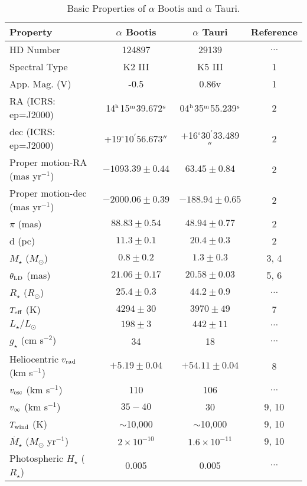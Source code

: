 \begin{table}[!hb]\small
\begin{center}
\caption[Basic Properties of $\alpha$ Bootis and $\alpha$ Tauri.]
{Basic Properties of $\alpha$ Bootis and $\alpha$ Tauri.}
\begin{tabular}{lccc}
\hline
\hline
\rule{0pt}{2.5ex}Property & $\alpha$ Bootis & $\alpha$ Tauri & Reference\\
\hline
\rule{0pt}{2.5ex}HD Number & 124897 & 29139 & $\ldots$\\
Spectral Type & K2 III & K5 III& 1\\ 
App. Mag. (V) & -0.5 & 0.86v & 1\\
RA (ICRS: ep=J2000)&14$^{\rm{h}}$15$^{\rm{m}}$39.672$^{\rm{s}}$&04$^{\rm{h}}$35$^{\rm{m}}$55.239$^{\rm{s}}$&2\\
dec (ICRS: ep=J2000) & +19$^{\circ}$10$^{\prime}$56.673$^{\prime\prime}$ & +16$^{\circ}$30$^{\prime}$33.489$^{\prime\prime}$ & 2 \\
Proper motion-RA (mas yr$^{-1}$)& $-1093.39 \pm 0.44$ & $63.45\pm 0.84$  & 2 \\
Proper motion-dec (mas yr$^{-1}$)& $-2000.06 \pm 0.39$ & $-188.94\pm 0.65$ & 2 \\
$\pi$ (mas)& $88.83\pm 0.54$ & $48.94\pm 0.77$& 2\\
d (pc)& $11.3 \pm 0.1$ & $20.4 \pm 0.3$& 2\\
$M_{\star}$ ($M_{\odot}$) & $0.8 \pm 0.2$ & $1.3 \pm 0.3$& 3, 4 \\
$\theta _{\rm{LD}}$ (mas)& $21.06\pm 0.17$ & $20.58 \pm 0.03$& 5, 6 \\
$R_{\star}$ ($R_{\odot}$)& $25.4 \pm 0.3$ & $44.2 \pm 0.9$ & $\ldots$ \\
$T_{\rm{eff}}$ (K) & $4294 \pm 30$ & $3970 \pm 49$& 7 \\
$L_{\star}/L_{\odot}$&$198 \pm 3$ &$442\pm 11$ & $\ldots$\\
$g_{\star}$ (cm s$^{-2}$)& 34& 18&$\ldots$\\
Heliocentric $v_{\rm{rad}}$ (km s$^{-1}$) & $+5.19 \pm 0.04$ & $+54.11\pm 0.04$ & 8\\
$v_{\rm{esc}}$ (km s$^{-1}$) &110 & 106& $\ldots$\\
$v_{\rm{\infty}}$ (km s$^{-1}$)& $35-40$ & 30& 9, 10\\
$T_{\rm{wind}}$ (K)& $\sim$10,000 & $\sim$10,000 & 9, 10\\
$\dot{M_{\star}}$ ($M_{\odot}$ yr$^{-1}$)& $2\times 10^{-10}$& $1.6\times 10^{-11}$& 9, 10\\
Photospheric $H_{\star}$ ($R_{\star}$)& 0.005& 0.005& $\ldots$\\

\end{tabular}
\end{center}
\end{table}
